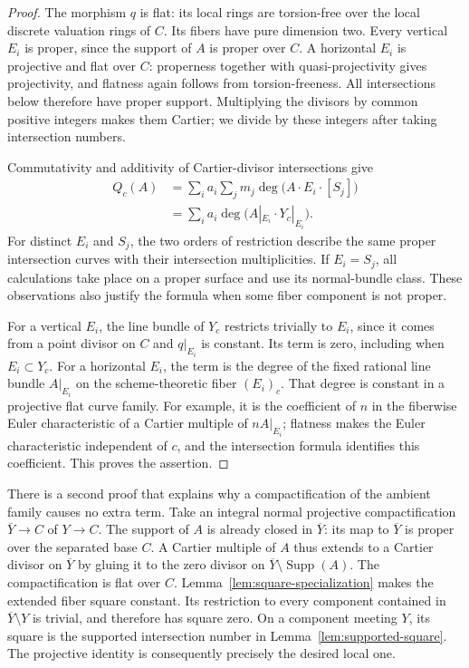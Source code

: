 \begin{proof}
The morphism $q$ is flat: its local rings are torsion-free over the
local discrete valuation rings of $C$.  Its fibers have pure dimension
two.  Every vertical $E_i$ is proper, since the support of $A$ is
proper over $C$.  A horizontal $E_i$ is projective and flat over $C$:
properness together with quasi-projectivity gives projectivity, and
flatness again follows from torsion-freeness.  All intersections below
therefore have proper support.  Multiplying the divisors by common
positive integers makes them Cartier; we divide by these integers
after taking intersection numbers.

Commutativity and additivity of Cartier-divisor intersections give
\begin{align*}
 Q_c(A)
 &=\sum_i a_i\sum_jm_j
       \deg\bigl(A\cdot E_i\cdot[S_j]\bigr)\\
 &=\sum_i a_i\deg\bigl(A|_{E_i}\cdot Y_c|_{E_i}\bigr).
\end{align*}
For distinct $E_i$ and $S_j$, the two orders of restriction describe
the same proper intersection curves with their intersection
multiplicities.  If $E_i=S_j$, all calculations take place on a proper
surface and use its normal-bundle class.  These observations also
justify the formula when some fiber component is not proper.

For a vertical $E_i$, the line bundle of $Y_c$ restricts trivially to
$E_i$, since it comes from a point divisor on $C$ and $q|_{E_i}$ is
constant.  Its term is zero, including when $E_i\subset Y_c$.
For a horizontal $E_i$, the term is the degree of the fixed rational
line bundle $A|_{E_i}$ on the scheme-theoretic fiber $(E_i)_c$.
That degree is constant in a projective flat curve family.  For
example, it is the coefficient of $n$ in the fiberwise Euler
characteristic of a Cartier multiple of $nA|_{E_i}$; flatness makes
the Euler characteristic independent of $c$, and the intersection
formula identifies this coefficient.  This proves the assertion.
\end{proof}

There is a second proof that explains why a compactification of the
ambient family causes no extra term.  Take an integral normal
projective compactification $\overline Y\to C$ of $Y\to C$.
The support of $A$ is already closed in $\overline Y$: its map to
$\overline Y$ is proper over the separated base $C$.  A Cartier
multiple of $A$ thus extends to a Cartier divisor on $\overline Y$
by gluing it to the zero divisor on
$\overline Y\setminus\operatorname{Supp}(A)$.  The compactification
is flat over $C$.  Lemma~\ref{lem:square-specialization} makes the
extended fiber square constant.  Its restriction to every component
contained in $\overline Y\setminus Y$ is trivial, and therefore has
square zero.  On a component meeting $Y$, its square is the supported
intersection number in Lemma~\ref{lem:supported-square}.  The
projective identity is consequently precisely the desired local one.


